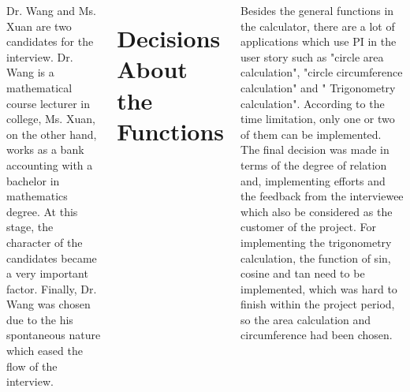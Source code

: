 \documentclass[20pt,margin=1in,innermargin=-4.5in,blockverticalspace=-0.25in]{tikzposter}
\begin{document}
\begin{columns}
{      Dr. Wang and Ms. Xuan are two candidates for the interview. Dr. Wang is a mathematical course lecturer in college, Ms. Xuan, on the other hand, works as a bank accounting with a bachelor in mathematics degree. At this stage, the character of the candidates became a very important factor. Finally, Dr. Wang was chosen due to the his spontaneous nature which eased the flow of the interview.

    \section{ Decisions About the Functions }
  Besides the general functions in the calculator, there are a lot of applications which use PI in the user story such as  "circle area calculation", "circle circumference calculation" and " Trigonometry calculation".  According to the time limitation, only one or two of them can be implemented. The final decision was made in terms of the degree of relation and, implementing efforts and the feedback from the interviewee which also be considered as the customer of the project. For implementing the trigonometry calculation, the function of sin, cosine and tan need to be implemented, which was hard to finish within the project period, so the area calculation and circumference had been chosen.

    }
\end{columns}
\end{document}
